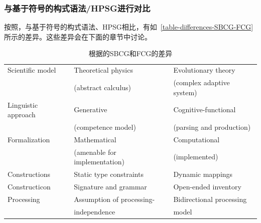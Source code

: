 \subsubsection{与基于符号的构式语法/HPSG进行对比}

按照\indexhpsgstartc\indexsbcgstartc\citet{vanTrijp2013a}，与基于符号的构式语法、HPSG相比，有如~\vref{table-differences-SBCG-FCG}所示的差异。这些差异会在下面的章节中讨论。
%
\begin{table}
\caption{\label{table-differences-SBCG-FCG}根据\citet[]{vanTrijp2013a}的SBCG和FCG的差异}
\begin{tabular}{@{}lll@{}}\hline\hline
Scientific model    & Theoretical physics           & Evolutionary theory\\
                    & (abstract calculus)           &  (complex adaptive system)\\
Linguistic approach & Generative                    & Cognitive-functional\\
                    & (competence model)            & (parsing and production)\\
Formalization       & Mathematical                  & Computational\\ 
                    & (amenable for implementation) & (implemented)\\
Constructions       & Static type constraints       & Dynamic mappings\\
Constructicon       & Signature and grammar         & Open-ended inventory\\
Processing          & Assumption of processing-     & Bidirectional processing\\
                    & independence                  & model\\\hline\hline
\end{tabular}
\end{table}%


